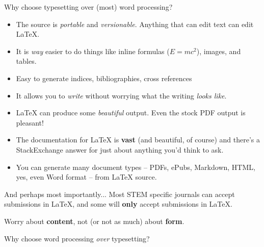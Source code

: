 \documentclass[handout]{beamer} %
\begin{document}
\begin{frame}
	Why choose typesetting over (most) word processing?
	\begin{itemize}
		\item The source is \textit{portable} and \textit{versionable}. Anything that can edit text can edit \LaTeX.
		\pause
		\item It is \textit{way} easier to do things like inline formulas ($E=mc^2$), images, and tables.
		\pause
		\item Easy to generate indices, bibliographies, cross references
		\pause 
		\item It allows you to \textit{write} without worrying what the writing \textit{looks like}.
		\pause
		\item \LaTeX{} can produce some \textit{beautiful} output. Even the stock PDF output is pleasant!
		\pause
		\item The documentation for \LaTeX{} is \textbf{vast} (and beautiful, of course) and there's a StackExchange answer for just about anything you'd think to ask.
		\pause
		\item You can generate many document types -- PDFs, ePubs, Markdown, HTML, yes, even Word format -- from \LaTeX{} source.
	\end{itemize}
	

\end{frame}

\begin{frame}{And perhaps most importantly...}
	Most STEM specific journals can accept submissions in \LaTeX, and some will \textbf{only} accept submissions in \LaTeX.
\end{frame}

\begin{frame}
	Worry about \textbf{content}, not (or not as much) about \textbf{form}.
\end{frame}


\begin{frame}
	Why choose word processing \textit{over} typesetting?
\end{frame}
\end{document}

